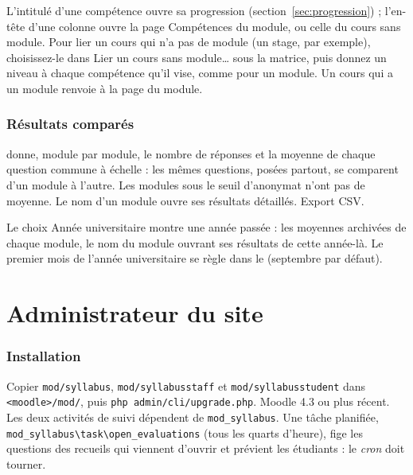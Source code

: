 \documentclass[11pt,a4paper]{article}
\begin{document}

L'intitulé d'une compétence ouvre sa progression (section~\ref{sec:progression}) ; l'en-tête
d'une colonne ouvre la page \og Compétences\fg{} du module, ou celle du cours sans module. Pour lier un cours qui n'a pas de module (un stage, par exemple), choisissez-le dans
\og Lier un cours sans module\dots\fg{} sous la matrice, puis donnez un niveau à chaque
compétence qu'il vise, comme pour un module. Un cours qui a un module renvoie à la page du
module.


\section{Résultats comparés}

 donne, module par module, le nombre de réponses et la
moyenne de chaque question commune à échelle : les mêmes questions, posées partout, se
comparent d'un module à l'autre. Les modules sous le seuil d'anonymat n'ont pas de moyenne.
Le nom d'un module ouvre ses résultats détaillés. Export CSV.


Le choix \og Année universitaire\fg{} montre une année passée : les moyennes archivées de chaque
module, le nom du module ouvrant ses résultats de cette année-là. Le premier mois de l'année
universitaire se règle dans le  (septembre par défaut).

\newpage
\part{Administrateur du site}\label{part:admin}

\section{Installation}

Copier \texttt{mod/syllabus}, \texttt{mod/syllabusstaff} et \texttt{mod/syllabusstudent} dans
\texttt{<moodle>/mod/}, puis \texttt{php admin/cli/upgrade.php}. Moodle 4.3 ou plus récent.
Les deux activités de suivi dépendent de \texttt{mod\_syllabus}. Une tâche planifiée,
\texttt{mod\_syllabus\textbackslash task\textbackslash open\_evaluations} (tous les quarts
d'heure), fige les questions des recueils qui viennent d'ouvrir et prévient les étudiants :
le \emph{cron} doit tourner.
\end{document}
